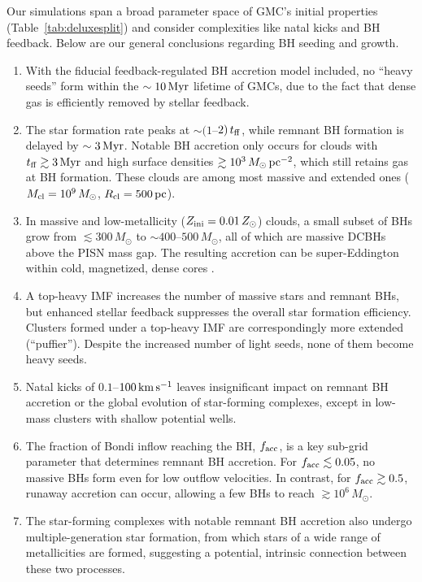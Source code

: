 \documentclass[twocolumn]{aastex631}
\begin{document}
Our simulations span a broad parameter space of GMC's initial properties (Table~\ref{tab:deluxesplit}) and consider complexities like natal kicks and BH feedback. Below are our general conclusions regarding BH seeding and growth.
\begin{enumerate}
    \item With the fiducial feedback-regulated BH accretion model included, no ``heavy seeds'' form within the $\sim 10\,\rm Myr$ lifetime of GMCs, due to the fact that dense gas is efficiently removed by stellar feedback.
    
    \item The star formation rate peaks at $\sim (1$--$2)\,t_{\rm ff}$, while remnant BH formation is delayed by $\sim 3\,\rm Myr$. Notable BH accretion only occurs for clouds with $t_{\rm ff}\gtrsim 3\,\rm Myr$ and high surface densities $\gtrsim 10^3\,M_\odot\,{\rm pc}^{-2}$, which still retains gas at BH formation. These clouds are among most massive and extended ones ($M_{\rm cl}=10^9\,M_\odot$, $R_{\rm cl}=500\,\rm pc$).
    
    \item In massive and low-metallicity ($Z_{\rm ini}=0.01\,Z_\odot$) clouds, a small subset of BHs grow from $\lesssim 300\,M_\odot$ to $\sim 400$--$500\,M_\odot$, all of which are massive DCBHs above the PISN mass gap. The resulting accretion can be super-Eddington within cold, magnetized, dense cores \citep[similar to][]{ShiKremerGrudic_2023MNRAS.518.3606S}.
    
    \item A top-heavy IMF increases the number of massive stars and remnant BHs, but enhanced stellar feedback suppresses the overall star formation efficiency. Clusters formed under a top-heavy IMF are correspondingly more extended (``puffier''). Despite the increased number of light seeds, none of them become heavy seeds.
    
    \item Natal kicks of $0.1$--$100\,\rm km\,s^{-1}$ leaves insignificant impact on remnant BH accretion or the global evolution of star-forming complexes, except in low-mass clusters with shallow potential wells.
    
    \item The fraction of Bondi inflow reaching the BH, $f_{\rm acc}$, is a key sub-grid parameter that determines remnant BH accretion. For $f_{\rm acc}\lesssim 0.05$, no massive BHs form even for low outflow velocities. In contrast, for $f_{\rm acc}\gtrsim 0.5$, runaway accretion can occur, allowing a few BHs to reach $\gtrsim 10^6\,M_\odot$.

    \item The star-forming complexes with notable remnant BH accretion also undergo multiple-generation star formation, from which stars of a wide range of metallicities are formed, suggesting a potential, intrinsic connection between these two processes.
\end{enumerate}
\end{document}
